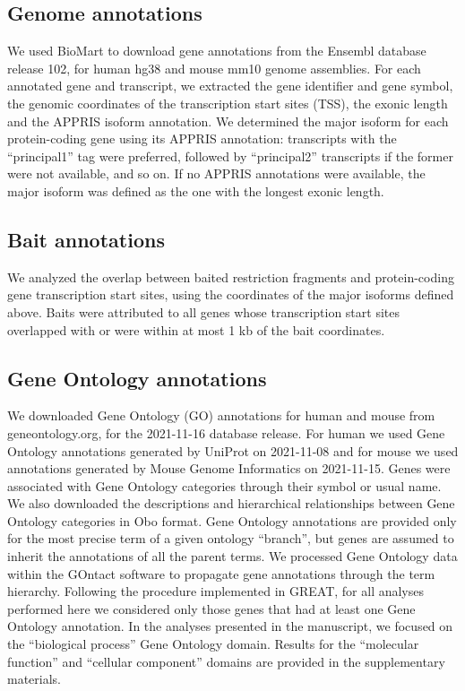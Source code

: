 \subsection*{Genome annotations}
We used BioMart to download gene annotations from the Ensembl database release 102, for human hg38 and mouse mm10 genome assemblies. For each annotated gene and transcript, we extracted the gene identifier and gene symbol, the genomic coordinates of the transcription start sites (TSS), the exonic length and the APPRIS isoform annotation. We determined the major isoform for each protein-coding gene using its APPRIS annotation: transcripts with the “principal1” tag were preferred, followed by “principal2” transcripts if the former were not available, and so on. If no APPRIS annotations were available, the major isoform was defined as the one with the longest exonic length. 

\subsection*{Bait annotations}
We analyzed the overlap between baited restriction fragments and protein-coding gene transcription start sites, using the coordinates of the major isoforms defined above. Baits were attributed to all genes whose transcription start sites overlapped with or were within at most 1 kb of the bait coordinates. 

\subsection*{Gene Ontology annotations}
We downloaded Gene Ontology (GO) annotations for human and mouse from geneontology.org, for the 2021-11-16 database release. For human we used Gene Ontology annotations generated by UniProt on 2021-11-08 and for mouse we used annotations generated by Mouse Genome Informatics on 2021-11-15. Genes were associated with Gene Ontology categories through their symbol or usual name. We also downloaded the descriptions and hierarchical relationships between Gene Ontology categories in Obo format. Gene Ontology annotations are provided only for the most precise term of a given ontology “branch”, but genes are assumed to inherit the annotations of all the parent terms. We processed Gene Ontology data within the GOntact software to propagate gene annotations through the term hierarchy. Following the procedure implemented in GREAT, for all analyses performed here we considered only those genes that had at least one Gene Ontology annotation. In the analyses presented in the manuscript, we focused on the “biological process” Gene Ontology domain. Results for the “molecular function” and “cellular component” domains are provided in the supplementary materials. 


